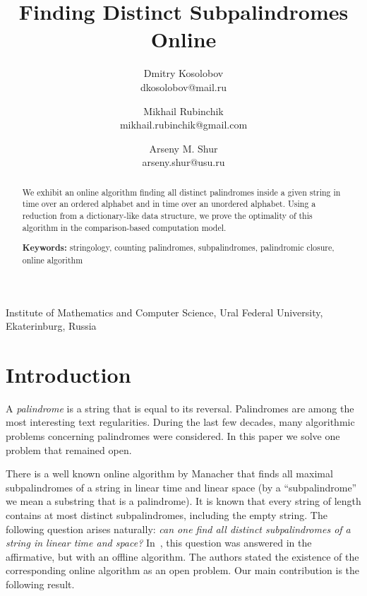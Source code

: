 \documentclass{article}
\theoremstyle{plain}
\theoremstyle{definition}
\begin{document}
\title{Finding Distinct Subpalindromes Online}

\author{
  Dmitry Kosolobov \\ dkosolobov@mail.ru \and 
  Mikhail Rubinchik \\ mikhail.rubinchik@gmail.com \and 
  Arseny M. Shur \\ arseny.shur@usu.ru}

\maketitle
\begin{center}
{Institute of Mathematics and Computer Science, Ural Federal University,\\
Ekaterinburg, Russia}
\end{center}

\begin{abstract}
We exhibit an online algorithm finding all distinct palindromes inside a given string in time  over an ordered alphabet and in time  over an unordered alphabet. Using a reduction from a dictionary-like data structure, we prove the optimality of this algorithm in the comparison-based computation model.

\textbf{Keywords: }{stringology, counting palindromes, subpalindromes, palindromic closure, online algorithm}

\end{abstract}



\section{Introduction}

A \emph{palindrome} is a string that is equal to its reversal. Palindromes are among the most interesting text regularities. During the last few decades, many algorithmic problems concerning palindromes were considered. In this paper we solve one problem that remained open.

There is a well known online algorithm by Manacher \cite{Man} that finds all maximal subpalindromes of a string in linear time and linear space (by a ``subpalindrome'' we mean a substring that is a palindrome). It is known \cite{DJP} that every string of length  contains at most  distinct subpalindromes, including the empty string. The following question arises naturally: \emph{can one find all distinct subpalindromes of a string in linear time and space?} In~\cite{GPR}, this question was answered in the affirmative, but with an offline algorithm. The authors stated the existence of the corresponding online algorithm as an open problem. Our main contribution is the following result.
\end{document}
